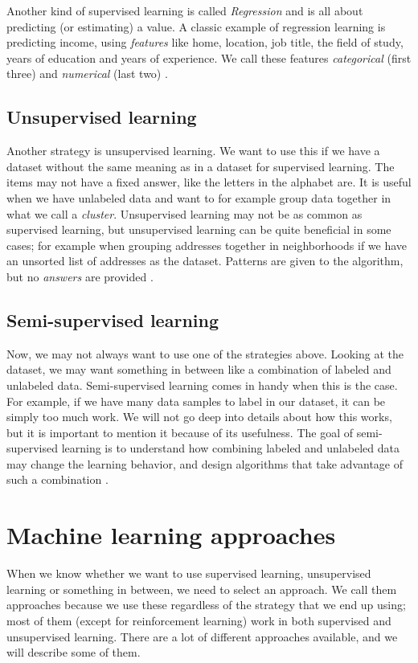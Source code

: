 Another kind of supervised learning is called \textit{Regression} and is all about predicting (or estimating) a value. A classic example of regression 
learning is predicting income, using \textit{features} like home, location, job title, the field of study,  years of education and years of experience. 
We call these features \textit{categorical} (first three) and \textit{numerical} (last two) \cite{supervised_learning}. 

\subsection{Unsupervised learning}
Another strategy is unsupervised learning. We want to use this if we have a dataset without the same meaning as in a dataset for supervised learning. 
The items may not have a fixed answer, like the letters in the alphabet are. It is useful when we have unlabeled data and want to for example group data 
together in what we call a \textit{cluster}. Unsupervised learning may not be as common as supervised learning, but unsupervised learning can be quite 
beneficial in some cases; for example when grouping addresses together in neighborhoods if we have an unsorted list of addresses as the dataset. Patterns are given to the algorithm, but no \textit{answers} are provided \cite{unsupervised_learning}. 

\subsection{Semi-supervised learning}
Now, we may not always want to use one of the strategies above. Looking at the dataset, we may want something in between like a combination of labeled and unlabeled data. 
Semi-supervised learning comes in handy when this is the case. For example, if we have many data samples to label in our dataset, it can be simply too much work. 
We will not go deep into details about how this works, but it is important to mention it because of its usefulness. The goal of semi-supervised learning is to understand how combining labeled and unlabeled data may change the learning behavior, and design algorithms that take advantage of such a combination \cite{semisupervised_learning}.

\section{Machine learning approaches}
When we know whether we want to use supervised learning, unsupervised learning or something in between, we need to select an approach. We call them 
approaches because we use these regardless of the strategy that we end up using; most of them (except for reinforcement learning) work in both 
supervised and unsupervised learning. There are a lot of different approaches available, and we will describe some of them.

